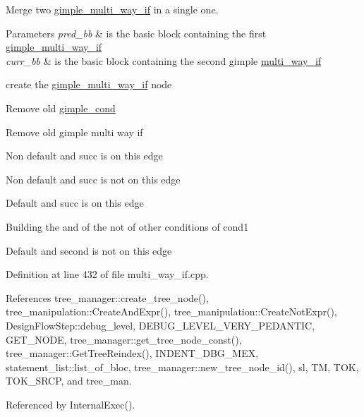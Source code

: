Merge two \hyperlink{structgimple__multi__way__if}{gimple\+\_\+multi\+\_\+way\+\_\+if} in a single one. 


\begin{DoxyParams}{Parameters}
{\em pred\+\_\+bb} & is the basic block containing the first \hyperlink{structgimple__multi__way__if}{gimple\+\_\+multi\+\_\+way\+\_\+if} \\
\hline
{\em curr\+\_\+bb} & is the basic block containing the second gimple \hyperlink{classmulti__way__if}{multi\+\_\+way\+\_\+if} \\
\hline
\end{DoxyParams}
create the \hyperlink{structgimple__multi__way__if}{gimple\+\_\+multi\+\_\+way\+\_\+if} node

Remove old \hyperlink{structgimple__cond}{gimple\+\_\+cond}

Remove old gimple multi way if

Non default and succ is on this edge

Non default and succ is not on this edge

Default and succ is on this edge

Building the and of the not of other conditions of cond1

Default and second is not on this edge 

Definition at line 432 of file multi\+\_\+way\+\_\+if.\+cpp.



References tree\+\_\+manager\+::create\+\_\+tree\+\_\+node(), tree\+\_\+manipulation\+::\+Create\+And\+Expr(), tree\+\_\+manipulation\+::\+Create\+Not\+Expr(), Design\+Flow\+Step\+::debug\+\_\+level, D\+E\+B\+U\+G\+\_\+\+L\+E\+V\+E\+L\+\_\+\+V\+E\+R\+Y\+\_\+\+P\+E\+D\+A\+N\+T\+IC, G\+E\+T\+\_\+\+N\+O\+DE, tree\+\_\+manager\+::get\+\_\+tree\+\_\+node\+\_\+const(), tree\+\_\+manager\+::\+Get\+Tree\+Reindex(), I\+N\+D\+E\+N\+T\+\_\+\+D\+B\+G\+\_\+\+M\+EX, statement\+\_\+list\+::list\+\_\+of\+\_\+bloc, tree\+\_\+manager\+::new\+\_\+tree\+\_\+node\+\_\+id(), sl, TM, T\+OK, T\+O\+K\+\_\+\+S\+R\+CP, and tree\+\_\+man.



Referenced by Internal\+Exec().

